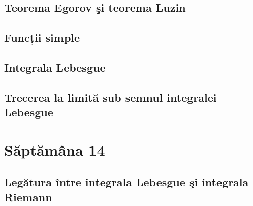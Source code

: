 \documentclass[a4paper,12pt]{article}
\theoremstyle{change}
\begin{document}
\subsection{Teorema Egorov şi teorema Luzin}


\subsection{Funcții simple}

\subsection{Integrala Lebesgue}


\subsection{Trecerea la limită sub semnul integralei Lebesgue}

\section{Săptămâna 14}


\subsection{Legătura între integrala Lebesgue şi integrala Riemann}
\end{document}
